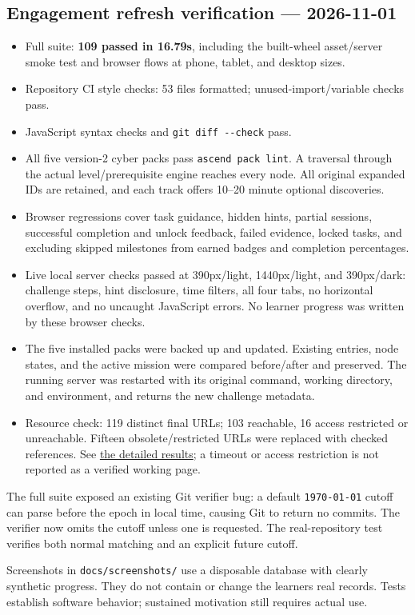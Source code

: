 \hypertarget{engagement-refresh-verification--2026-11-01}{%
\subsection{Engagement refresh verification ---
2026-11-01}\label{engagement-refresh-verification--2026-11-01}}

\begin{itemize}
\tightlist
\item
  Full suite: \textbf{109 passed in 16.79s}, including the built-wheel
  asset/server smoke test and browser flows at phone, tablet, and
  desktop sizes.
\item
  Repository CI style checks: 53 files formatted; unused-import/variable
  checks pass.
\item
  JavaScript syntax checks and \texttt{git diff -\/-check} pass.
\item
  All five version-2 cyber packs pass \texttt{ascend pack lint}. A
  traversal through the actual level/prerequisite engine reaches every
  node. All original expanded IDs are retained, and each track offers
  10--20 minute optional discoveries.
\item
  Browser regressions cover task guidance, hidden hints, partial
  sessions, successful completion and unlock feedback, failed evidence,
  locked tasks, and excluding skipped milestones from earned badges and
  completion percentages.
\item
  Live local server checks passed at 390px/light, 1440px/light, and
  390px/dark: challenge steps, hint disclosure, time filters, all four
  tabs, no horizontal overflow, and no uncaught JavaScript errors. No
  learner progress was written by these browser checks.
\item
  The five installed packs were backed up and updated. Existing entries,
  node states, and the active mission were compared before/after and
  preserved. The running server was restarted with its original command,
  working directory, and environment, and returns the new challenge
  metadata.
\item
  Resource check: 119 distinct final URLs; 103 reachable, 16 access
  restricted or unreachable. Fifteen obsolete/restricted URLs were
  replaced with checked references. See
  \href{cyber-track-links.json}{the detailed results}; a timeout or
  access restriction is not reported as a verified working page.
\end{itemize}

The full suite exposed an existing Git verifier bug: a default
\texttt{1970-01-01} cutoff can parse before the epoch in local time,
causing Git to return no commits. The verifier now omits the cutoff
unless one is requested. The real-repository test verifies both normal
matching and an explicit future cutoff.

Screenshots in \texttt{docs/screenshots/} use a disposable database with
clearly synthetic progress. They do not contain or change the
learner\textquotesingle s real records. Tests establish software
behavior; sustained motivation still requires actual use.
